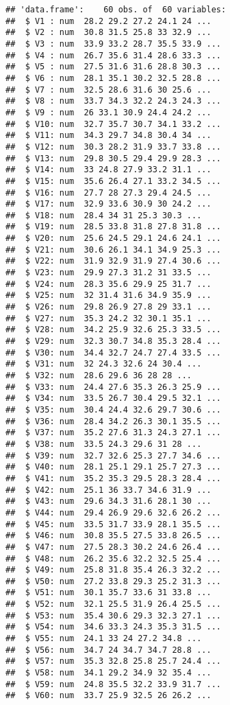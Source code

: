 \documentclass[
]{article}
\begin{document}
\begin{verbatim}
## 'data.frame':    60 obs. of  60 variables:
##  $ V1 : num  28.2 29.2 27.2 24.1 24 ...
##  $ V2 : num  30.8 31.5 25.8 33 32.9 ...
##  $ V3 : num  33.9 33.2 28.7 35.5 33.9 ...
##  $ V4 : num  26.7 35.6 31.4 28.6 33.3 ...
##  $ V5 : num  27.5 31.6 31.6 28.8 30.3 ...
##  $ V6 : num  28.1 35.1 30.2 32.5 28.8 ...
##  $ V7 : num  32.5 28.6 31.6 30 25.6 ...
##  $ V8 : num  33.7 34.3 32.2 24.3 24.3 ...
##  $ V9 : num  26 33.1 30.9 24.4 24.2 ...
##  $ V10: num  32.7 35.7 30.7 34.1 33.2 ...
##  $ V11: num  34.3 29.7 34.8 30.4 34 ...
##  $ V12: num  30.3 28.2 31.9 33.7 33.8 ...
##  $ V13: num  29.8 30.5 29.4 29.9 28.3 ...
##  $ V14: num  33 24.8 27.9 33.2 31.1 ...
##  $ V15: num  35.6 26.4 27.1 33.2 34.5 ...
##  $ V16: num  27.7 28 27.3 29.4 24.5 ...
##  $ V17: num  32.9 33.6 30.9 30 24.2 ...
##  $ V18: num  28.4 34 31 25.3 30.3 ...
##  $ V19: num  28.5 33.8 31.8 27.8 31.8 ...
##  $ V20: num  25.6 24.5 29.1 24.6 24.1 ...
##  $ V21: num  30.6 26.1 34.1 34.9 25.3 ...
##  $ V22: num  31.9 32.9 31.9 27.4 30.6 ...
##  $ V23: num  29.9 27.3 31.2 31 33.5 ...
##  $ V24: num  28.3 35.6 29.9 25 31.7 ...
##  $ V25: num  32 31.4 31.6 34.9 35.9 ...
##  $ V26: num  29.8 26.9 27.8 29 33.1 ...
##  $ V27: num  35.3 24.2 32 30.1 35.1 ...
##  $ V28: num  34.2 25.9 32.6 25.3 33.5 ...
##  $ V29: num  32.3 30.7 34.8 35.3 28.4 ...
##  $ V30: num  34.4 32.7 24.7 27.4 33.5 ...
##  $ V31: num  32 24.3 32.6 24 30.4 ...
##  $ V32: num  28.6 29.6 36 28 28 ...
##  $ V33: num  24.4 27.6 35.3 26.3 25.9 ...
##  $ V34: num  33.5 26.7 30.4 29.5 32.1 ...
##  $ V35: num  30.4 24.4 32.6 29.7 30.6 ...
##  $ V36: num  28.4 34.2 26.3 30.1 35.5 ...
##  $ V37: num  35.2 27.6 31.3 24.3 27.1 ...
##  $ V38: num  33.5 24.3 29.6 31 28 ...
##  $ V39: num  32.7 32.6 25.3 27.7 34.6 ...
##  $ V40: num  28.1 25.1 29.1 25.7 27.3 ...
##  $ V41: num  35.2 35.3 29.5 28.3 28.4 ...
##  $ V42: num  25.1 36 33.7 34.6 31.9 ...
##  $ V43: num  29.6 34.3 31.6 28.1 30 ...
##  $ V44: num  29.4 26.9 29.6 32.6 26.2 ...
##  $ V45: num  33.5 31.7 33.9 28.1 35.5 ...
##  $ V46: num  30.8 35.5 27.5 33.8 26.5 ...
##  $ V47: num  27.5 28.3 30.2 24.6 26.4 ...
##  $ V48: num  26.2 35.6 32.2 32.5 25.4 ...
##  $ V49: num  25.8 31.8 35.4 26.3 32.2 ...
##  $ V50: num  27.2 33.8 29.3 25.2 31.3 ...
##  $ V51: num  30.1 35.7 33.6 31 33.8 ...
##  $ V52: num  32.1 25.5 31.9 26.4 25.5 ...
##  $ V53: num  35.4 30.6 29.3 32.3 27.1 ...
##  $ V54: num  34.6 33.3 24.3 35.3 31.5 ...
##  $ V55: num  24.1 33 24 27.2 34.8 ...
##  $ V56: num  34.7 24 34.7 34.7 28.8 ...
##  $ V57: num  35.3 32.8 25.8 25.7 24.4 ...
##  $ V58: num  34.1 29.2 34.9 32 35.4 ...
##  $ V59: num  24.8 35.5 32.2 33.9 31.7 ...
##  $ V60: num  33.7 25.9 32.5 26 26.2 ...
\end{verbatim}
\end{document}
